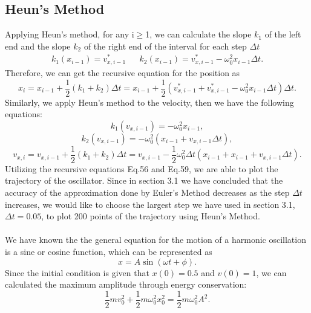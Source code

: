 \documentclass[12pt]{report}
\begin{document}
\subsection{Heun's Method}
Applying Heun's method, for any i$\ge$1, we can calculate the slope $k_1$ of the left end and the slope $k_2$ of the right end of the interval for each step $\Delta t$
\begin{align}
	k_{1}(x_{i-1})=v_{x,i-1}^* && k_{2}(x_{i-1})=v_{x,i-1}^*-\omega_{0}^2x_{i-1}\Delta t.
\end{align}
Therefore, we can get the recursive equation for the position as
\begin{equation}
    x_{i}=x_{i-1}+\frac{1}{2}(k_{1}+k_{2})\Delta t=x_{i-1}+\frac{1}{2}(v_{x,i-1}^*+v_{x,i-1}^*-\omega_{0}^2x_{i-1}\Delta t)\Delta t.
\end{equation}
Similarly, we apply Heun's method to the velocity, then we have the following equations:
\begin{equation}
    k_{1}(v_{x,i-1})=-\omega_{0}^2x_{i-1},
\end{equation}
\begin{equation}
    k_{2}(v_{x,i-1})=-\omega_{0}^2(x_{i-1}+v_{x,i-1}\Delta t),
\end{equation}
\begin{equation}
    v_{x,i}=v_{x,i-1}+\frac{1}{2}(k_{1}+k_{2})\Delta t=v_{x,i-1}-\frac{1}{2}\omega_{0}^2\Delta t(x_{i-1}+x_{i-1}+v_{x,i-1}\Delta t).
\end{equation}
Utilizing the recursive equations Eq.56 and Eq.59, we are able to plot the trajectory of the oscillator. Since in section 3.1 we have concluded that the accuracy of the approximation done by Euler's Method decreases as the step $\Delta t$ increases, we would like to choose the largest step we have used in section 3.1, $\Delta t=0.05$, to plot 200 points of the trajectory using Heun's Method.\\~\\
We have known the the general equation for the motion of a harmonic oscillation is a sine or cosine function, which can be represented as
\begin{equation}
	x=A\sin(\omega t+\phi).
\end{equation}
Since the initial condition is given that $x(0)=0.5$ and $v(0)=1$, we can calculated the maximum amplitude through energy conservation:
\begin{equation}
	\frac{1}{2}mv_0^2+\frac{1}{2}m\omega_0^2 x_0^2=\frac{1}{2}m\omega_0^2 A^2.
\end{equation}
\end{document}
